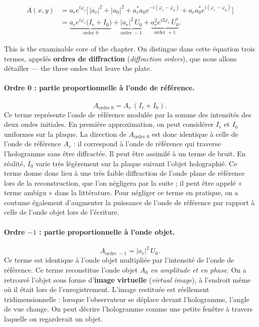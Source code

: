 \begin{theorem}
  \begin{align*}
    A(x,y) &= a_r e^{i\varphi_r}\Big[\,|a_r|^2+|a_0|^2
              + a_r^{*}a_0 e^{-i(\varphi_r-\varphi_0)}
              + a_r a_0^{*}e^{i(\varphi_r-\varphi_0)}\Big] \\[2pt]
           &= \underbrace{a_r e^{i\varphi_r}\big(I_r+I_0\big)}_{\text{order }0}
            + \underbrace{|a_r|^2\,U_0}_{\text{order }-1}
            + \underbrace{a_r^2 e^{i2\varphi_r}\,U_0^{*}}_{\text{order }+1}.
  \end{align*}
\end{theorem}

This is the examinable core of the chapter. On distingue dans cette équation
trois termes, appelés \textbf{ordres de diffraction} (\textit{diffraction
orders}), que nous allons détailler --- the three ondes that leave the plate.

\paragraph{Ordre 0 : partie proportionnelle à l'onde de référence.}
\begin{equation*}
  A_{\text{ordre }0} = A_r\,(I_r+I_0).
\end{equation*}
Ce terme représente l'onde de référence modulée par la somme des intensités des
deux ondes initiales. En première approximation, on peut considérer $I_r$ et
$I_0$ uniformes sur la plaque. La direction de $A_{\text{ordre }0}$ est donc
identique à celle de l'onde de référence $A_r$ : il correspond à l'onde de
référence qui traverse l'hologramme sans être diffractée. Il peut être assimilé à
un terme de bruit. En réalité, $I_0$ varie très légèrement sur la plaque suivant
l'objet holographié. Ce terme donne donc lieu à une très faible diffraction de
l'onde plane de référence lors de la reconstruction, que l'on négligera par la
suite ; il peut être appelé « terme ambigu » dans la littérature. Pour négliger
ce terme en pratique, on a coutume également d'augmenter la puissance de l'onde
de référence par rapport à celle de l'onde objet lors de l'écriture.

\paragraph{Ordre $-1$ : partie proportionnelle à l'onde objet.}
\begin{equation*}
  A_{\text{ordre }-1} = |a_r|^2\,U_0 .
\end{equation*}
Ce terme est identique à l'onde objet multipliée par l'intensité de l'onde de
référence. Ce terme reconstitue l'onde objet $A_0$ \emph{en amplitude et en
phase}. On a retrouvé l'objet sous forme d'\textbf{image virtuelle}
(\textit{virtual image}), à l'endroit même où il était lors de l'enregistrement.
L'image restituée est réellement tridimensionnelle : lorsque l'observateur se
déplace devant l'hologramme, l'angle de vue change. On peut décrire l'hologramme
comme une petite fenêtre à travers laquelle on regarderait un objet.

